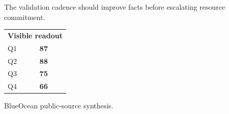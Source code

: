 \documentclass[10pt,a4paper]{article}
\begin{document}
\vspace{1pt}\noindent\begin{minipage}[t]{0.56\linewidth}
{\footnotesize\color{BOText} The validation cadence should improve facts before escalating resource commitment.}\par
\end{minipage}\hfill\begin{minipage}[t]{0.36\linewidth}
{\scriptsize\color{BOText}\begin{tabular}{p{31mm}>{\raggedleft\arraybackslash}p{18mm}}
\multicolumn{2}{l}{\textcolor{BOGreen}{\bfseries Visible readout}}\\[2pt]
Q1 & \textbf{87}\\[1pt]
Q2 & \textbf{88}\\[1pt]
Q3 & \textbf{75}\\[1pt]
Q4 & \textbf{66}\\[1pt]
\end{tabular}}\par
\end{minipage}\par\vspace{1pt}
\par
{\scriptsize\color{BOMuted} BlueOcean public-source synthesis.}\par
\end{document}

